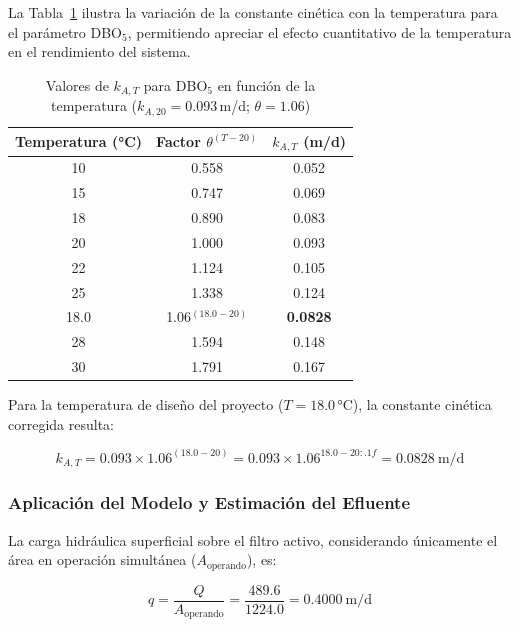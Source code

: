 \documentclass[12pt,a4paper]{article}
\begin{document}
La Tabla~\ref{tab:kAT_temperatura} ilustra la variación de la constante cinética con la temperatura para el parámetro DBO$_5$, permitiendo apreciar el efecto cuantitativo de la temperatura en el rendimiento del sistema.

\begin{table}[H]
\centering
\caption{Valores de $k_{A,T}$ para DBO$_5$ en función de la temperatura ($k_{A,20} = 0.093$\,m/d; $\theta = 1.06$)}
\label{tab:kAT_temperatura}
\begin{tabular}{ccc}
\toprule
\textbf{Temperatura (°C)} & \textbf{Factor $\theta^{(T-20)}$} & \textbf{$k_{A,T}$ (m/d)} \\
\midrule
10 & 0.558 & 0.052 \\
15 & 0.747 & 0.069 \\
18 & 0.890 & 0.083 \\
20 & 1.000 & 0.093 \\
22 & 1.124 & 0.105 \\
25 & 1.338 & 0.124 \\
18.0 & 1.06$^{(18.0-20)}$ & \textbf{0.0828} \\
28 & 1.594 & 0.148 \\
30 & 1.791 & 0.167 \\
\bottomrule
\end{tabular}
\end{table}

Para la temperatura de diseño del proyecto ($T = 18.0$\,°C), la constante cinética corregida resulta:

\begin{equation}
k_{A,T} = 0.093 \times 1.06^{(18.0 - 20)} = 0.093 \times 1.06^{18.0 - 20:.1f} = 0.0828\ \text{m/d}
\end{equation}

\subsubsection*{Aplicación del Modelo y Estimación del Efluente}

La carga hidráulica superficial sobre el filtro activo, considerando únicamente el área en operación simultánea ($A_\text{operando}$), es:

\begin{equation}
q = \frac{Q}{A_\text{operando}} = \frac{489.6}{1224.0} = 0.4000\ \text{m/d}
\end{equation}
\end{document}
